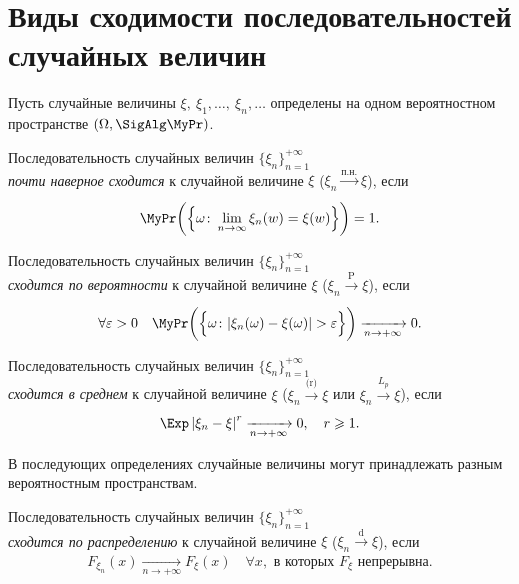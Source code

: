 \section{Виды сходимости последовательностей случайных величин}
Пусть случайные величины $\xi, \: \xi_1, \ldots, \: \xi_n, \ldots$ определены на одном вероятностном пространстве $\left(\Omega, \SigAlg \MyPr\right)$.

\begin{defn}
    Последовательность случайных величин $\{\xi_n\}_{n = 1}^{+\infty}$ \\ 
    \textit{почти наверное сходится} к случайной величине $\xi$ ($\xi_n \xrightarrow[]{\text{п.н.}} \xi$), если
    \begin{equation*}
        \MyPr\biggl(\left\{\omega \colon \lim\limits _{n \to \infty} \xi_{n}(w)=\xi(w)\right\}\biggr)=1.
    \end{equation*}
\end{defn}

\begin{defn}
    Последовательность случайных величин $\{\xi_n\}_{n = 1}^{+\infty}$ \\
    \textit{сходится по вероятности} к случайной величине $\xi$ ($\xi_n \xrightarrow[]{\text{P}} \xi$), если
    \begin{equation*}
        \forall \varepsilon>0 \quad \MyPr \biggl( \Bigl\{ \omega \colon |\xi_{n}(\omega)-\xi(\omega)|>\varepsilon \Bigr\} \biggr) \xrightarrow[n \to +\infty]{} 0.
    \end{equation*}
\end{defn}

\begin{defn}
    Последовательность случайных величин $\{\xi_n\}_{n=1}^{+\infty}$ \\
    \textit{сходится в среднем} к случайной величине $\xi$ ($\xi_n \xrightarrow[]{\text{(r)}} \xi$ или $\xi_n \xrightarrow[]{L_p} \xi$), если
    \begin{equation*}
        \Exp \left|\xi_{n}-\xi\right|^{r} \xrightarrow[n \to +\infty]{} 0, \quad r \geqslant 1.
    \end{equation*}
\end{defn}

В последующих определениях случайные величины могут принадлежать разным вероятностным пространствам.
\begin{defn}
    Последовательность случайных величин $\{\xi_n\}_{n=1}^{+\infty}$ \\
    \textit{сходится по распределению} к случайной величине $\xi$ ($\xi_n \xrightarrow[]{\text{d}} \xi$), если
    \begin{equation*}
        F_{\xi_n}(x) \xrightarrow[n \to +\infty]{} F_{\xi}(x) \quad \forall x, \text{ в которых } F_{\xi} \text{ непрерывна}.
    \end{equation*}
\end{defn}

